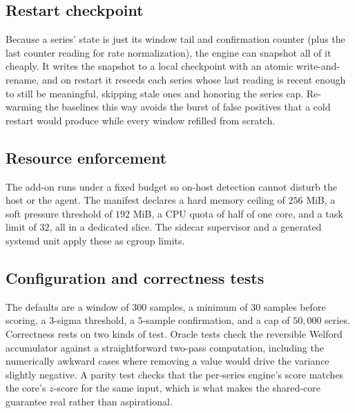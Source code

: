 \subsection{Restart checkpoint}
Because a series' state is just its window tail and confirmation counter (plus the
last counter reading for rate normalization), the engine can snapshot all of it
cheaply. It writes the snapshot to a local checkpoint with an atomic
write-and-rename, and on restart it reseeds each series whose last reading is recent
enough to still be meaningful, skipping stale ones and honoring the series cap.
Re-warming the baselines this way avoids the burst of false positives that a cold
restart would produce while every window refilled from scratch.

\subsection{Resource enforcement}
The add-on runs under a fixed budget so on-host detection cannot disturb the host
or the agent. The manifest declares a hard memory ceiling of $256$ MiB, a soft
pressure threshold of $192$ MiB, a CPU quota of half of one core, and a task limit
of $32$, all in a dedicated slice. The sidecar supervisor and a generated systemd
unit apply these as cgroup limits.

\subsection{Configuration and correctness tests}
The defaults are a window of $300$ samples, a minimum of $30$ samples before
scoring, a $3$-sigma threshold, a $5$-sample confirmation, and a cap of $50{,}000$
series. Correctness rests on two kinds of test. Oracle tests check the reversible
Welford accumulator against a straightforward two-pass computation, including the
numerically awkward cases where removing a value would drive the variance slightly
negative. A parity test checks that the per-series engine's score matches the
core's $z$-score for the same input, which is what makes the shared-core guarantee
real rather than aspirational.
